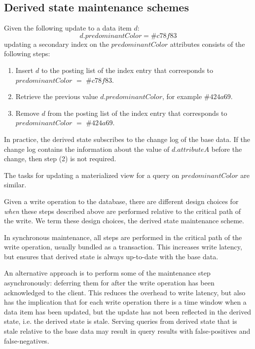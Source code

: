 \subsection{Derived state maintenance schemes}
\label{sec:sync_async_maintenance}


Given the following update to a data item $d$:
\[
d.predominantColor = \#c78f83
\]
updating a secondary index on the $predominantColor$ attributes consists of the following steps:
\begin{enumerate}
  \item Insert $d$ to the posting list of the index entry that corresponds to $predominantColor$ $=$ $\#c78f83$.
  \item Retrieve the previous value $d.predominantColor$, for example $\#424a69$.
  \item Remove $d$ from the posting list of the index entry that corresponds to $predominantColor$ $=$ $\#424a69$.
\end{enumerate}

In practice, the derived state subscribes to the change log of the base data.
If the change log contains the information about the value of $d.attributeA$ before the change, then step (2) is not
required.

The tasks for updating a materialized view for a query on $predominantColor$ are similar.
\medskip

Given a write operation to the database,
there are different design choices for \textit{when} these steps described above are performed relative to the critical
path of the write.
We term these design choices, the derived state maintenance scheme.

In synchronous maintenance, all steps are performed in the critical path of the write operation,
usually bundled as a transaction.
This increases write latency, but ensures that derived state is always up-to-date with the base data.

An alternative approach is to perform some of the maintenance step asynchronously: deferring them for after the write
operation has been acknowledged to the client.
This reduces the overhead to write latency, but also has the implication that for each write operation
there is a time window when a data item has been updated, but the update has not been reflected in the derived state,
i.e. the derived state is stale.
Serving queries from derived state that is stale relative to the base data may result in query results with false-positives
and false-negatives.

